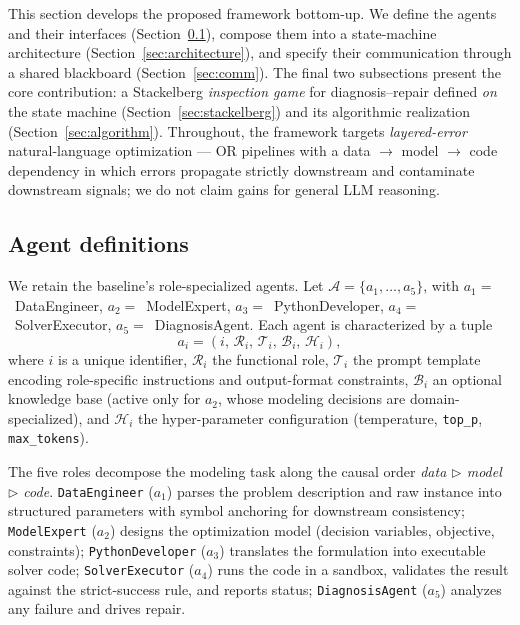 \documentclass[a4paper,fleqn]{cas-sc}
\newcommand{\Acal}{\mathcal{A}}
\newcommand{\tri}{\triangleright}
\begin{document}
This section develops the proposed framework bottom-up. We define the agents
and their interfaces (Section~\ref{sec:agents}), compose them into a
state-machine architecture (Section~\ref{sec:architecture}), and specify their
communication through a shared blackboard (Section~\ref{sec:comm}). The final
two subsections present the core contribution: a Stackelberg
\emph{inspection game} for diagnosis--repair defined \emph{on} the state
machine (Section~\ref{sec:stackelberg}) and its algorithmic realization
(Section~\ref{sec:algorithm}). Throughout, the framework targets
\emph{layered-error} natural-language optimization --- OR pipelines with a
data $\to$ model $\to$ code dependency in which errors propagate strictly
downstream and contaminate downstream signals; we do not claim gains for
general LLM reasoning.

\subsection{Agent definitions}
\label{sec:agents}

We retain the baseline's role-specialized agents. Let
$\Acal=\{a_1,\dots,a_5\}$, with $a_1=$~DataEngineer, $a_2=$~ModelExpert,
$a_3=$~PythonDeveloper, $a_4=$~SolverExecutor, $a_5=$~DiagnosisAgent. Each
agent is characterized by a tuple
\begin{equation}\label{eq:agent}
a_i=(i,\,\mathcal{R}_i,\,\mathcal{T}_i,\,\mathcal{B}_i,\,\mathcal{H}_i),
\end{equation}
where $i$ is a unique identifier, $\mathcal{R}_i$ the functional role,
$\mathcal{T}_i$ the prompt template encoding role-specific instructions and
output-format constraints, $\mathcal{B}_i$ an optional knowledge base (active
only for $a_2$, whose modeling decisions are domain-specialized), and
$\mathcal{H}_i$ the hyper-parameter configuration (temperature,
\texttt{top\_p}, \texttt{max\_tokens}).

The five roles decompose the modeling task along the causal order
\emph{data $\tri$ model $\tri$ code}. \texttt{DataEngineer} ($a_1$) parses the
problem description and raw instance into structured parameters with symbol
anchoring for downstream consistency; \texttt{ModelExpert} ($a_2$) designs the
optimization model (decision variables, objective, constraints);
\texttt{PythonDeveloper} ($a_3$) translates the formulation into executable
solver code; \texttt{SolverExecutor} ($a_4$) runs the code in a sandbox,
validates the result against the strict-success rule, and reports status;
\texttt{DiagnosisAgent} ($a_5$) analyzes any failure and drives repair.
\end{document}
